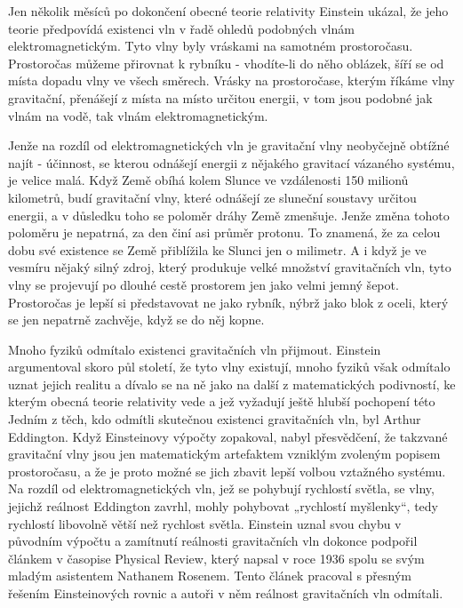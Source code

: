   Jen několik měsíců po dokončení obecné teorie relativity Einstein ukázal, že jeho teorie
  předpovídá existenci vln v řadě ohledů podobných vlnám elektromagnetickým. Tyto vlny byly vráskami
  na samotném prostoročasu. Prostoročas můžeme přirovnat k rybníku - vhodíte-li do něho oblázek,
  šíří se od místa dopadu vlny ve všech směrech. Vrásky na prostoročase, kterým říkáme vlny
  gravitační, přenášejí z místa na místo určitou energii, v tom jsou podobné jak vlnám na vodě, tak
  vlnám elektromagnetickým. 

  Jenže na rozdíl od elektromagnetických vln je gravitační vlny neobyčejně obtížné najít - účinnost,
  se kterou odnášejí energii z nějakého gravitací vázaného systému, je velice malá. Když Země obíhá
  kolem Slunce ve vzdálenosti 150 milionů kilometrů, budí gravitační vlny, které odnášejí ze
  sluneční soustavy určitou energii, a v důsledku toho se poloměr dráhy Země zmenšuje. Jenže změna
  tohoto poloměru je nepatrná, za den činí asi průměr protonu. To znamená, že za celou dobu své
  existence se Země přiblížila ke Slunci jen o milimetr. A i když je ve vesmíru nějaký silný zdroj,
  který produkuje velké množství gravitačních vln, tyto vlny se projevují po dlouhé cestě prostorem
  jen jako velmi jemný šepot. Prostoročas je lepší si představovat ne jako rybník, nýbrž jako blok z
  oceli, který se jen nepatrně zachvěje, když se do něj kopne. 

  Mnoho fyziků odmítalo existenci gravitačních vln přijmout. Einstein argumentoval skoro půl
  století, že tyto vlny existují, mnoho fyziků však odmítalo uznat jejich realitu a dívalo se na ně
  jako na další z matematických podivností, ke kterým obecná teorie relativity vede a jež vyžadují
  ještě hlubší pochopení této Jedním z těch, kdo odmítli skutečnou existenci gravitačních vln, byl
  Arthur Eddington. Když Einsteinovy výpočty zopakoval, nabyl přesvědčení, že takzvané gravitační
  vlny jsou jen matematickým artefaktem vzniklým zvoleným popisem prostoročasu, a že je proto možné
  se jich zbavit lepší volbou vztažného systému. Na rozdíl od elektromagnetických vln, jež se
  pohybují rychlostí světla, se vlny, jejichž reálnost Eddington zavrhl, mohly pohybovat „rychlostí
  myšlenky“, tedy rychlostí libovolně větší než rychlost světla. Einstein uznal svou chybu v
  původním výpočtu a zamítnutí reálnosti gravitačních vln dokonce podpořil článkem v časopise
  Physical Review, který napsal v roce 1936 spolu se svým mladým asistentem Nathanem Rosenem. Tento
  článek pracoval s přesným řešením Einsteinových rovnic a autoři v něm reálnost gravitačních vln
  odmítali. 


